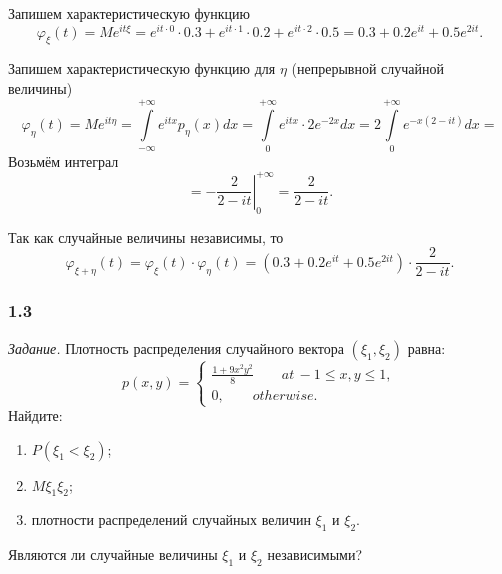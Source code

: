 Запишем характеристическую функцию
\begin{equation*}
  \varphi_{ \xi } \left( t \right) =
  Me^{it \xi } =
  e^{it \cdot 0} \cdot 0.3 + e^{it \cdot 1} \cdot 0.2 +
  e^{it \cdot 2} \cdot 0.5 =
  0.3 + 0.2 e^{it} + 0.5 e^{2it}.
\end{equation*}

Запишем характеристическую функцию для $ \eta $ (непрерывной случайной величины)
\begin{equation*}
  \varphi_{ \eta } \left( t \right) =
  Me^{it \eta } =
  \int \limits_{-\infty }^{+\infty } e^{itx} p_{ \eta } \left( x \right) dx =
  \int \limits_0^{+\infty } e^{itx} \cdot 2 e^{-2x} dx =
  2 \int \limits_0^{+\infty } e^{-x \left( 2 - it \right) } dx =
\end{equation*}
Возьмём интеграл
\begin{equation*}
  = \left. -\frac{2}{2 - it} \right|_0^{+\infty } =
  \frac{2}{2 - it}.
\end{equation*}

Так как случайные величины независимы, то
\begin{equation*}
  \varphi_{ \xi + \eta } \left( t \right) =
  \varphi_{ \xi } \left( t \right) \cdot \varphi_{ \eta } \left( t \right) =
  \left( 0.3 + 0.2 e^{it} + 0.5 e^{2it} \right) \cdot \frac{2}{2 - it}.
\end{equation*}

\subsubsection*{1.3}

\textit{Задание.}
Плотность распределения случайного вектора $ \left( \xi_1, \xi_2 \right) $
равна:
\begin{equation*}
  p \left( x, y \right) =
  \begin{cases}
    \frac{1 + 9x^2 y^2}{8} \qquad at \, -1 \leq x, y \leq 1, \\
    0, \qquad otherwise.
  \end{cases}
\end{equation*}
Найдите:
\begin{enumerate}[label=\alph*)]
  \item $P \left( \xi_1 < \xi_2 \right) $;
  \item $M \xi_1 \xi_2$;
  \item плотности распределений случайных величин $ \xi_1$ и $ \xi_2$.
\end{enumerate}
Являются ли случайные величины $ \xi_1$ и $ \xi_2$ независимыми?


